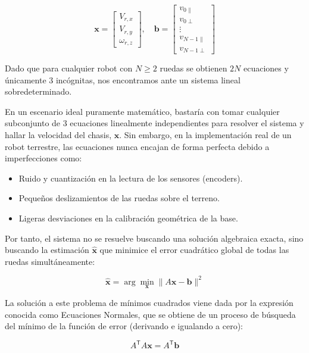 \documentclass[11pt,a4paper]{article}
\newcommand{\trans}{\mathsf{T}}      %
\begin{document}
\[
    \mathbf{x} =
    \begin{bmatrix}
        V_{r,x} \\
        V_{r,y} \\
        \omega_{r,z}
    \end{bmatrix}, \quad \mathbf{b} = \begin{bmatrix}
        v_{0\parallel}   \\
        v_{0\perp}       \\
        \vdots           \\
        v_{N-1\parallel} \\
        v_{N-1\perp}
    \end{bmatrix}
\]

Dado que para cualquier robot con \(N \ge 2\) ruedas se obtienen \(2N\) ecuaciones y únicamente 3 incógnitas, nos encontramos ante un sistema lineal sobredeterminado.

En un escenario ideal puramente matemático, bastaría con tomar cualquier subconjunto de 3 ecuaciones linealmente independientes para resolver el sistema y hallar la velocidad del chasis, \(\mathbf{x}\). Sin embargo, en la implementación real de un robot terrestre, las ecuaciones nunca encajan de forma perfecta debido a imperfecciones como:

\begin{itemize}
    \item Ruido y cuantización en la lectura de los sensores (encoders).
    \item Pequeños deslizamientos de las ruedas sobre el terreno.
    \item Ligeras desviaciones en la calibración geométrica de la base.
\end{itemize}

Por tanto, el sistema no se resuelve buscando una solución algebraica exacta, sino buscando la estimación \(\hat{\mathbf{x}}\) que minimice el error cuadrático global de todas las ruedas simultáneamente:

\begin{equation}
    \hat{\mathbf{x}} = \arg\min_{\mathbf{x}} \|A\mathbf{x} - \mathbf{b}\|^2
\end{equation}

La solución a este problema de mínimos cuadrados viene dada por la expresión conocida como Ecuaciones Normales, que se obtiene de un proceso de búsqueda del mínimo de la función de error (derivando e igualando a cero):

\begin{equation}
    A^{\trans} A \mathbf{x} = A^{\trans} \mathbf{b}
\end{equation}
\end{document}
